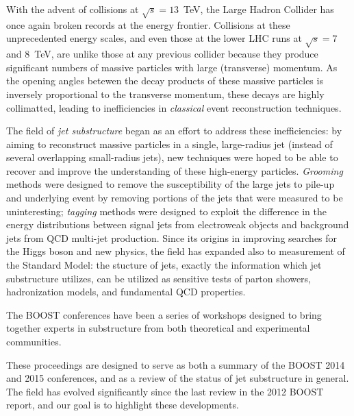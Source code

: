 \label{introduction}

With the advent of collisions at $\sqrt{s} = 13$~TeV, the Large Hadron Collider has once again broken records at the energy frontier. Collisions at these unprecedented energy scales, and even those at the lower LHC runs at $\sqrt{s} = 7$ and $8$~TeV, are unlike those at any previous collider because they produce significant numbers of massive particles with large (transverse) momentum. As the opening angles betewen the decay products of these massive particles is inversely proportional to the transverse momentum, these decays are highly collimatted, leading to inefficiencies in \textit{classical} event reconstruction techniques.

The field of \textit{jet substructure} began as an effort to address these inefficiencies: by aiming to reconstruct massive particles in a single, large-radius jet (instead of several overlapping small-radius jets), new techniques were hoped to be able to recover and improve the understanding of these high-energy particles. \textit{Grooming} methods were designed to remove the susceptibility of the large jets to pile-up and underlying event by removing portions of the jets that were measured to be uninteresting;  \textit{tagging} methods were designed to exploit the difference in the energy distributions between signal jets from electroweak objects and background jets from QCD multi-jet production. Since its origins in improving searches for the Higgs boson and new physics, the field has expanded also to measurement of the Standard Model: the stucture of jets, exactly the information which jet substructure utilizes, can be utilized as sensitive tests of parton showers, hadronization models, and fundamental QCD properties. 

The BOOST conferences have been a series of workshops designed to bring together experts in substructure from both theoretical and experimental communities.

These proceedings are designed to serve as both a summary of the BOOST 2014 and 2015 conferences, and as a review of the status of jet substructure in general. The field has evolved significantly since the last review in the 2012 BOOST report, and our goal is to highlight these developments. %